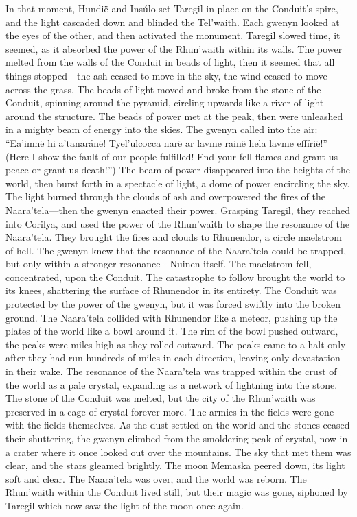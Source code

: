 \documentclass[smalldemyvopaper,11pt,twoside,onecolumn,openright,extrafontsizes]{memoir}
\begin{document}
{{In that moment, Hundië and Insúlo set Taregil in place on the Conduit’s spire, and the light cascaded down and blinded the Tel’waith. Each gwenyn looked at the eyes of the other, and then activated the monument. Taregil slowed time, it seemed, as it absorbed the power of the Rhun’waith within its walls. The power melted from the walls of the Conduit in beads of light, then it seemed that all things stopped—the ash ceased to move in the sky, the wind ceased to move across the grass. The beads of light moved and broke from the stone of the Conduit, spinning around the pyramid, circling upwards like a river of light around the structure. The beads of power met at the peak, then were unleashed in a mighty beam of energy into the skies. The gwenyn called into the air:
“Ea’imnë hi a’tanaránë! Tyel’ulcocca narë ar lavme rainë hela lavme effírië!”
(Here I show the fault of our people fulfilled! End your fell flames and grant us peace or grant us death!”)
	The beam of power disappeared into the heights of the world, then burst forth in a spectacle of light, a dome of power encircling the sky. The light burned through the clouds of ash and overpowered the fires of the Naara’tela—then the gwenyn enacted their power. Grasping Taregil, they reached into Corilya, and used the power of the Rhun’waith to shape the resonance of the Naara’tela. They brought the fires and clouds to Rhunendor, a circle maelstrom of hell. The gwenyn knew that the resonance of the Naara’tela could be trapped, but only within a stronger resonance—Nuinen itself. The maelstrom fell, concentrated, upon the Conduit. The catastrophe to follow brought the world to its knees, shattering the surface of Rhunendor in its entirety. The Conduit was protected by the power of the gwenyn, but it was forced swiftly into the broken ground. The Naara’tela collided with Rhunendor like a meteor, pushing up the plates of the world like a bowl around it. The rim of the bowl pushed outward, the peaks were miles high as they rolled outward. The peaks came to a halt only after they had run hundreds of miles in each direction, leaving only devastation in their wake. The resonance of the Naara’tela was trapped within the crust of the world as a pale crystal, expanding as a network of lightning into the stone. The stone of the Conduit was melted, but the city of the Rhun’waith was preserved in a cage of crystal forever more. The armies in the fields were gone with the fields themselves. As the dust settled on the world and the stones ceased their shuttering, the gwenyn climbed from the smoldering peak of crystal, now in a crater where it once looked out over the mountains. The sky that met them was clear, and the stars gleamed brightly. The moon Memaska peered down, its light soft and clear. The Naara’tela was over, and the world was reborn. The Rhun’waith within the Conduit lived still, but their magic was gone, siphoned by Taregil which now saw the light of the moon once again.
}}
\end{document}

